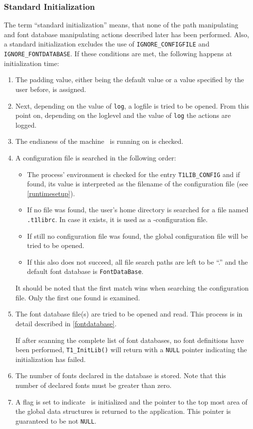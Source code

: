 \subsubsection{Standard Initialization}
\label{standardinitialization}%
The term ``standard initialization'' means, that none of the path manipulating
and font database manipulating actions described later has been
performed. Also, a standard initialization excludes the use of
\verb+IGNORE_CONFIGFILE+ and \verb+IGNORE_FONTDATABASE+. If these conditions
are met, the following happens at initialization time:
\begin{enumerate}
\item The padding value, either being the default value or a value specified
  by the user before, is assigned.
\item Next, depending on the value of \verb+log+, a logfile is tried to be
  opened. From this point on, depending on the loglevel and the value of
  \verb+log+ the actions are logged.
\item The endianess of the machine \tonelib\ is running on is checked. 
\item A configuration file is searched in the following order:
  \begin{itemize}
  \item The process' environment is checked for the entry \verb+T1LIB_CONFIG+
  and if found, its value is interpreted as the filename of the configuration
  file (see \ref{runtimesetup}).
  \item If no file was found, the user's home directory is searched for a file
    named \verb+.t1librc+. In case it exists, it is used as a
    \tonelib-configuration file. 
  \item If still no configuration file was found, the global configuration
    file will be tried to be opened.
  \item If this also does not succeed, all file search paths are left to be
    ``.'' and the default font database is \verb+FontDataBase+.
  \end{itemize}
  It should be noted that the first match wins when searching the configuration
  file. Only the first one found is examined.
\item The font database file(s) are tried to be opened and read. This process
  is in detail described in \ref{fontdatabase}. 
  
  If after scanning the complete list of font databases, no font definitions
  have been performed, \verb+T1_InitLib()+ will return with a \verb+NULL+
  pointer indicating the initialization has failed.
\item The number of fonts declared in the database is stored. Note that this
  number of declared fonts must be greater than zero.
\item A flag is set to indicate \tonelib\ is initialized and the pointer to
  the top most area of the global data structures is returned to the
  application. This pointer is guaranteed to be not \verb+NULL+.
\end{enumerate}
